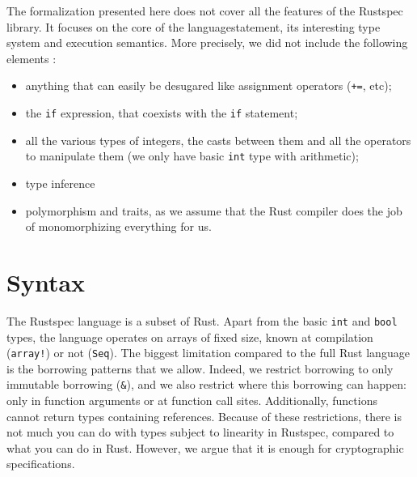 \documentclass[11pt,a4paper]{article}
\newcommand{\rustspec}{\textsf{Rustspec}}
\newcommand{\syntext}[1]{\texttt{#1}}
\newcommand{\synkeyword}[1]{\textcolor{red!60!black}{\syntext{#1}}}
\newcommand{\synpunct}[1]{\textcolor{black!40!white}{\texttt{#1}}}
\newcommand{\synbool}{\synkeyword{bool}}
\newcommand{\synint}{\synkeyword{int}}
\newcommand{\synseq}{\syntext{Seq}}
\newcommand{\synif}{\synkeyword{if}\;}
\newcommand{\synarraymacro}{\synkeyword{array!}}
\newcommand{\synref}{\synpunct{\&}}
\begin{document}
The formalization presented here does not cover all the features of the \rustspec{} library. It
focuses on the core of the languagestatement, its interesting type system and execution semantics. More
precisely, we did not include the following elements :
\begin{itemize}
  \item anything that can easily be desugared like assignment operators (\synpunct{+=}, etc);
  \item the \synif{} expression, that coexists with the \synif{} statement;
  \item all the various types of integers, the casts between them and all the operators to
  manipulate them (we only have basic \synint{} type with arithmetic);
  \item type inference
  \item polymorphism and traits, as we assume that the Rust compiler does the job of monomorphizing
  everything for us.
\end{itemize}

\section{Syntax}

The \rustspec{} language is a subset of Rust. Apart from the basic \synint{} and \synbool{} types,
the language operates on arrays of fixed size, known at compilation (\synarraymacro{}) or not
(\synseq). The biggest limitation compared to the full Rust language is the borrowing patterns
that we allow. Indeed, we restrict borrowing to only immutable borrowing (\synref{}),
and we also restrict where this borrowing can happen: only in function arguments or at function call
sites. Additionally, functions cannot return types containing references. Because of these restrictions,
there is not much you can do with types subject to linearity in \rustspec, compared to what you
can do in Rust. However, we argue that it is enough for cryptographic specifications.
\end{document}
